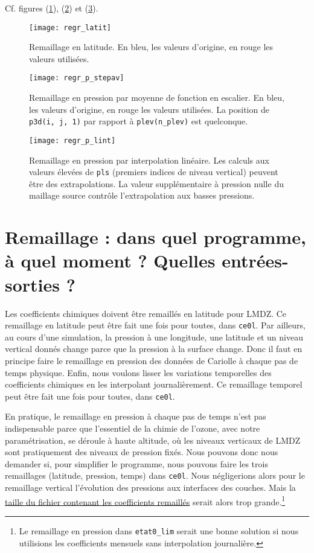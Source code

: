 \documentclass[a4paper,english,french]{article}
\begin{document}
Cf. figures (\ref{fig:regr_latit}), (\ref{fig:regr_p_stepav}) et
(\ref{fig:regr_p_lint}).
\begin{figure}[htbp]
  \centering
  \texttt{[image: regr\_latit]}
  \caption[Remaillage en latitude pour l'ozone]{Remaillage en
    latitude. En bleu, les valeurs d'origine, en rouge les valeurs
    utilisées.}
  \label{fig:regr_latit}
\end{figure}
\begin{figure}[htbp]
  \centering
  \texttt{[image: regr\_p\_stepav]}  
  \caption[Remaillage en pression conservatif pour l'ozone]
  {Remaillage en pression par moyenne de fonction en escalier.  En
    bleu, les valeurs d'origine, en rouge les valeurs utilisées. La
    position de \texttt{p3d(i, j, 1)} par rapport à
    \texttt{plev(n\_plev)} est quelconque.}
  \label{fig:regr_p_stepav}
\end{figure}
\begin{figure}[htbp]
  \centering
  \texttt{[image: regr\_p\_lint]}  
  \caption[Interpolation linéaire en pression pour l'ozone]{Remaillage
    en pression par interpolation linéaire. Les calculs aux valeurs
    élevées de \texttt{pls} (premiers indices de niveau vertical)
    peuvent être des extrapolations. La valeur supplémentaire à
    pression nulle du maillage source contrôle l'extrapolation aux
    basses pressions.}
  \label{fig:regr_p_lint}
\end{figure}

\section[Remaillage : programme, moment,
entrées-sorties]{Remaillage : dans quel programme, à quel moment ?
  Quelles entrées-sorties ?}

Les coefficients chimiques doivent être remaillés en latitude pour LMDZ.
Ce remaillage en latitude peut être fait une fois pour toutes, dans
\verb+ce0l+. Par ailleurs, au cours d'une simulation, la pression
à une longitude, une latitude et un niveau vertical donnés change
parce que la pression à la surface change. Donc il faut en principe
faire le remaillage en pression des données de Cariolle à chaque pas
de temps physique. Enfin, nous voulons lisser les variations
temporelles des coefficients chimiques en les interpolant
journalièrement. Ce remaillage temporel peut être fait une fois pour
toutes, dans \verb+ce0l+.

En pratique, le remaillage en pression à chaque pas de temps n'est pas
indispensable parce que l'essentiel de la chimie de l'ozone, avec
notre paramétrisation, se déroule à haute altitude, où les niveaux
verticaux de LMDZ sont pratiquement des niveaux de pression fixés.
Nous pouvons donc nous demander si, pour simplifier le programme, nous
pouvons faire les trois remaillages (latitude, pression, temps) dans
\verb+ce0l+. Nous négligerions alors pour le remaillage vertical
l'évolution des pressions aux interfaces des couches. Mais la
\href{file:///user/guez/Documents/Travail autour de
  LMDZ/taille.ods}{taille du fichier contenant les coefficients
  remaillés} serait alors trop grande.\footnote{Le remaillage en
  pression dans \texttt{etat0\_lim} serait une bonne solution si nous
  utilisions les coefficients mensuels sans interpolation
  journalière.}
\end{document}
